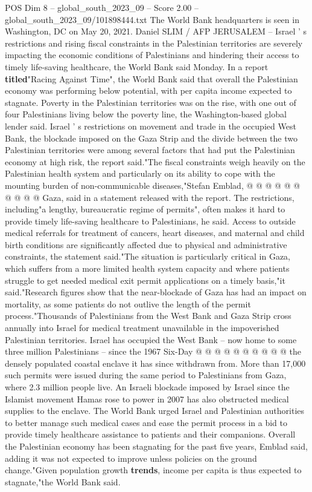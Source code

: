 \begin{textsample}{POS Dim 8 – global\_south\_2023\_09 – Score 2.00 – global\_south\_2023\_09/101898444.txt}  \label{ex:f8_pos_441}
The World Bank headquarters is seen in Washington, DC on May 20, 2021.
Daniel SLIM / AFP JERUSALEM -- Israel ' s restrictions and rising fiscal constraints in the Palestinian territories are severely impacting the economic conditions of Palestinians and hindering their access to timely life-saving healthcare, the World Bank said Monday.
In a report \textbf{titled}"Racing Against Time", the World Bank said that overall the Palestinian economy was performing below potential, with per capita income expected to stagnate.
Poverty in the Palestinian territories was on the rise, with one out of four Palestinians living below the poverty line, the Washington-based global lender said.
Israel ' s restrictions on movement and trade in the occupied West Bank, the blockade imposed on the Gaza Strip and the divide between the two Palestinian territories were among several factors that had put the Palestinian economy at high risk, the report said."The fiscal constraints weigh heavily on the Palestinian health system and particularly on its ability to cope with the mounting burden of non-communicable diseases,"Stefan Emblad, @ @ @ @ @ @ @ @ @ @ Gaza, said in a statement released with the report.
The restrictions, including"a lengthy, bureaucratic regime of permits", often makes it hard to provide timely life-saving healthcare to Palestinians, he said.
Access to outside medical referrals for treatment of cancers, heart diseases, and maternal and child birth conditions are significantly affected due to physical and administrative constraints, the statement said."The situation is particularly critical in Gaza, which suffers from a more limited health system capacity and where patients struggle to get needed medical exit permit applications on a timely basis,"it said."Research figures show that the near-blockade of Gaza has had an impact on mortality, as some patients do not outlive the length of the permit process."Thousands of Palestinians from the West Bank and Gaza Strip cross annually into Israel for medical treatment unavailable in the impoverished Palestinian territories.
Israel has occupied the West Bank -- now home to some three million Palestinians -- since the 1967 Six-Day @ @ @ @ @ @ @ @ @ @ the densely populated coastal enclave it has since withdrawn from.
More than 17,000 such permits were issued during the same period to Palestinians from Gaza, where 2.3 million people live.
An Israeli blockade imposed by Israel since the Islamist movement Hamas rose to power in 2007 has also obstructed medical supplies to the enclave.
The World Bank urged Israel and Palestinian authorities to better manage such medical cases and ease the permit process in a bid to provide timely healthcare assistance to patients and their companions.
Overall the Palestinian economy has been stagnating for the past five years, Emblad said, adding it was not expected to improve unless policies on the ground change."Given population growth \textbf{trends}, income per capita is thus expected to stagnate,"the World Bank said.

\end{textsample}
